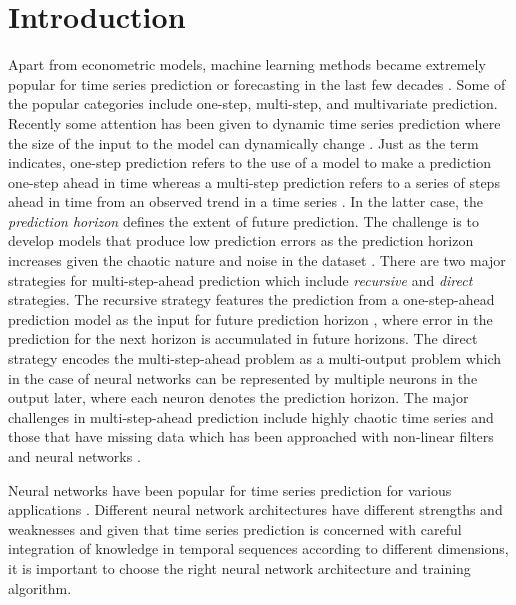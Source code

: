 \documentclass[final,5p,times,twocolumn]{elsarticle}
\begin{document}
\section{Introduction}
\label{S:1}



Apart from econometric models, machine learning methods became extremely popular for time series  prediction or forecasting in the last few decades \cite{tealab2018time,cheng2015time,taieb2012review,ahmed2010empirical,Gooijer2006,li2005recent,hendry1983econometric}. Some of the popular categories include one-step, multi-step, and multivariate prediction. Recently some attention has been given to dynamic time series prediction where the size of the input to the model can   dynamically change \cite{chandra2018co}. Just as the term indicates,  one-step prediction refers to the use of a model to make a prediction one-step ahead in time whereas a multi-step prediction refers to a series of steps ahead in time  from an observed trend in a time series 
\cite{sandya2013feature, chandra2012cooperative}. In the latter case, the \textit{prediction horizon}
defines the extent  of future prediction. The challenge is to develop models that 
produce low  
prediction errors as the prediction horizon increases  given the chaotic nature 
and noise in the dataset
\cite{taieb2015bias,chang2012reinforced,bone2002multi}. There are two major strategies for  multi-step-ahead 
prediction which include  \textit{recursive} and  
\textit{direct}  strategies. The recursive strategy features the  prediction from 
a one-step-ahead prediction model  as the input for future
prediction horizon
\cite{zhang2013iterated,ben2012recursive}, where 
error in the prediction for the next horizon is accumulated in future horizons. 
The direct strategy encodes  the multi-step-ahead problem   as a multi-output problem   \cite{Sorjamaa2007,BenTaieb2010}  which in the case of neural networks can be represented by multiple neurons in the output later, where each neuron denotes the prediction horizon. 
The major challenges in multi-step-ahead prediction include   highly chaotic time series 
and those that have missing data which has been approached  with non-linear filters and neural 
networks
\cite{Wu2014missingdate}.  

 
 
Neural networks have been popular for time series prediction for various applications \cite{frank2001time}. Different neural network architectures have different strengths and weaknesses and given that time series prediction is concerned with careful integration of knowledge in temporal sequences according to different dimensions, it is important to choose the right neural network architecture and training algorithm. 
\end{document}
